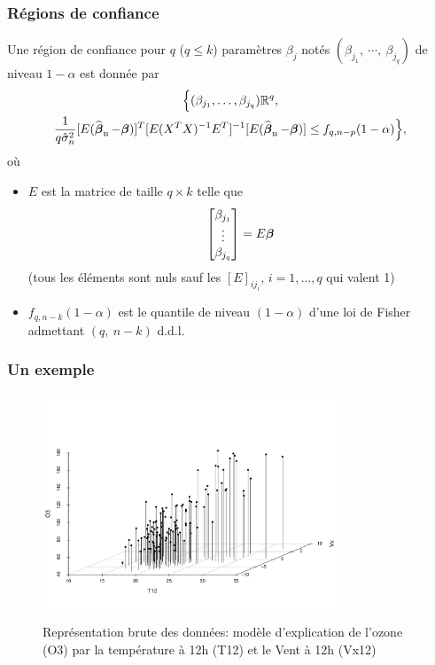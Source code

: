 \begin{frame}
\frametitle{Régions de confiance}
\begin{theo}
 Une région de confiance  pour $q$ ($q\leq k$)  param\`{e}tres $\beta_{j}$ notés $(\beta_{j_{1}},\ \cdots,\ \beta_{j_{q}})$ de niveau
 $ 1-\alpha$ est donn\'{e}e  par
\begin{multline*}
\Big\{(\beta_{j_1},\dots,\beta_{j_q}) \mathbb{R}^q, \\ \frac{1}{q\hat{\sigma}_n^{2}}[E(\operatorname{\widehat{\boldsymbol{\beta}}_n}-\boldsymbol{\beta})]^T[E(X^TX)^{-1}E^T]^{-1}[E(\operatorname{\widehat{\boldsymbol{\beta}}_n}-\boldsymbol{\beta})]\leq f_{q,n-p}(1-\alpha)\Big\},
\end{multline*}
o\`{u}
\begin{itemize}
\item $E$ est la matrice de taille $q\times k$ telle que
$$
\left[
\begin{matrix}
  \beta_{j_1} \\
  \vdots \\
  \beta_{j_q}
\end{matrix}
\right]
= E \boldsymbol{\beta}
$$
(tous les éléments sont nuls sauf les $[E]_{ij_{i}}$, $i=1,\dots,q$ qui valent 1)
\item $f_{q,n-k}(1-\alpha)$ est le quantile de niveau $(1-\alpha)$ d'une loi de Fisher admettant $(q,\ n-k)$ d.d.l.
\end{itemize}
\end{theo}
\end{frame}

\begin{frame}
\frametitle{Un exemple}
\begin{figure}
  \centering
  \includegraphics[width=0.8\textwidth]{ScatterPlot}\\
  \caption{Représentation brute des données: modèle d'explication de l'ozone (O3) par la température à 12h (T12) et le Vent à 12h (Vx12)}
\end{figure}
\end{frame}

